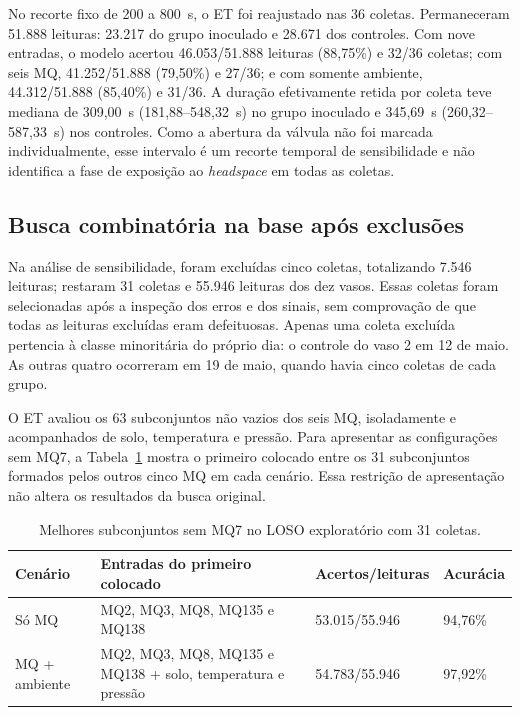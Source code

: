 No recorte fixo de 200 a 800~s, o ET foi reajustado nas 36 coletas.
Permaneceram 51.888 leituras: 23.217 do grupo inoculado e 28.671 dos
controles. Com nove entradas, o modelo acertou 46.053/51.888 leituras
(88,75\%) e 32/36 coletas; com seis MQ, 41.252/51.888 (79,50\%) e
27/36; e com somente ambiente, 44.312/51.888 (85,40\%) e 31/36.
A duração efetivamente retida por coleta teve mediana de 309,00~s
(181,88--548,32~s) no grupo inoculado e 345,69~s
(260,32--587,33~s) nos controles. Como a abertura da válvula não foi
marcada individualmente, esse intervalo é um recorte temporal de
sensibilidade e não identifica a fase de exposição ao \textit{headspace}
em todas as coletas.

\subsection{Busca combinatória na base após exclusões}
\label{subsec:resultados_busca_combinatoria_filtrada}

Na análise de sensibilidade, foram excluídas cinco coletas, totalizando
7.546 leituras; restaram 31 coletas e 55.946 leituras dos dez vasos.
Essas coletas foram selecionadas após a inspeção dos erros e dos sinais,
sem comprovação de que todas as leituras excluídas eram defeituosas.
Apenas uma coleta excluída pertencia à classe minoritária do próprio dia:
o controle do vaso 2 em 12 de maio. As outras quatro ocorreram em 19 de
maio, quando havia cinco coletas de cada grupo.

O ET avaliou os 63 subconjuntos não vazios dos seis MQ, isoladamente
e acompanhados de solo, temperatura e pressão. Para apresentar as
configurações sem MQ7, a Tabela~\ref{tab:busca_mq_filtrada} mostra o
primeiro colocado entre os 31 subconjuntos formados pelos outros cinco
MQ em cada cenário. Essa restrição de apresentação não altera os
resultados da busca original.
\begin{table}[H]
    \centering
    \footnotesize
    \caption{Melhores subconjuntos sem MQ7 no LOSO exploratório com 31 coletas.}
    \label{tab:busca_mq_filtrada}
    \begin{tabular}{p{}p{}p{}p{}}
        \hline
        Cenário & Entradas do primeiro colocado & Acertos/leituras & Acurácia \\
        \hline
        Só MQ & MQ2, MQ3, MQ8, MQ135 e MQ138 & 53.015/55.946 & 94,76\% \\
        MQ + ambiente & MQ2, MQ3, MQ8, MQ135 e MQ138 + solo, temperatura e pressão & 54.783/55.946 & 97,92\% \\
        \hline
    \end{tabular}
\end{table}

